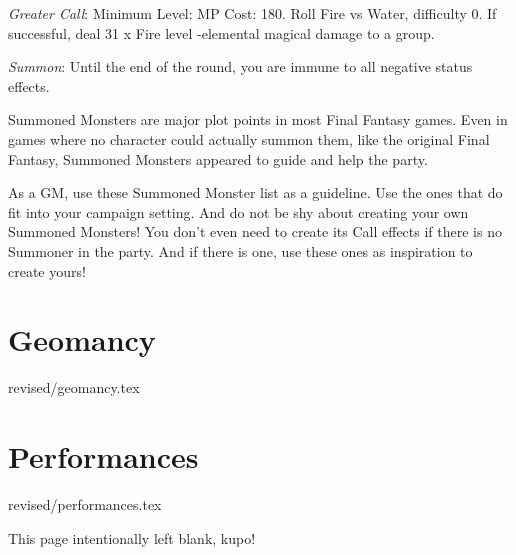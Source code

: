 \begin{multicols}{2}
    \textit{Greater Call}: Minimum Level:  MP Cost: 180. Roll Fire vs Water, difficulty 0. If successful, deal 31 x Fire level -elemental magical damage to a group.
    
    \textit{Summon}: Until the end of the round, you are immune to all negative status effects.

\begin{mog}
    Summoned Monsters are major plot points in most Final Fantasy games. Even in games where no character could actually summon them, like the original Final Fantasy, Summoned Monsters appeared to guide and help the party. \pc%

    As a GM, use these Summoned Monster list as a guideline. Use the ones that do fit into your campaign setting. And do not be shy about creating your own Summoned Monsters! You don't even need to create its Call effects if there is no Summoner in the party. And if there is one, use these ones as inspiration to create yours!
\end{mog}
\end{multicols}
\clearpage
\section{Geomancy}\label{sec:magic-geomancy}
 {revised/geomancy.tex}

\section{Performances}\label{sec:magic-performances}
 {revised/performances.tex}

\clearpage
\begin{center}



    \textcolor{mogred}{\arabtype\LARGE This page intentionally left blank, kupo!}

\end{center}